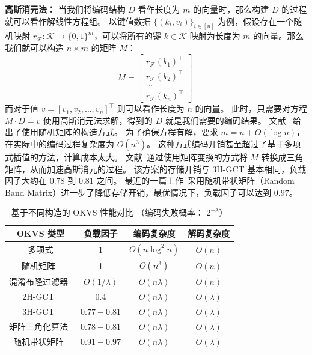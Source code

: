 \textbf{高斯消元法：}
当我们将编码结构 $D$ 看作长度为 $m$ 的向量时，那么构建 $D$ 的过程就可以看作解线性方程组。
以键值数据 $\{(k_i, v_i)\}_{i\in [n]}$ 为例，假设存在一个随机映射 $r_{\mathcal{F}}:\mathcal{K} \to \{0,1\}^m$，可以将所有的键 $k\in \mathcal{K}$ 映射为长度为 $m$ 的向量。那么我们就可以构造 $n\times m$ 的矩阵 $M$：
\begin{equation}
  M = \left[ \begin{array}{c} r_{\mathcal{F}}(k_1)^\intercal \\ r_{\mathcal{F}}(k_2)^\intercal \\ \dots \\ r_{\mathcal{F}}(k_n)^\intercal  \end{array}  \right].
\end{equation}
而对于值 $v=[v_1, v_2, \dots, v_n]^\intercal$ 则可以看作长度为 $n$ 的向量。
此时，只需要对方程 $M\cdot D = v$ 使用高斯消元法求解，得到的 $D$ 就是我们需要的编码结果。
文献~\cite{garimella2021oblivious} 给出了使用随机矩阵的构造方式。
为了确保方程有解，要求 $m = n + O(\log n)$，在实际中的编码过程复杂度为 $O(n^3)$。
这种方式编码开销甚至超过了基于多项式插值的方法，计算成本太大。
文献~\cite{raghuraman2022blazing}通过使用矩阵变换的方式将 $M$ 转换成三角矩阵，从而加速高斯消元的过程。
该方案的存储开销与 3H-GCT 基本相同，负载因子大约在 $0.78$ 到 $0.81$ 之间。
最近的一篇工作~\cite{bienstock2023NearOptimal}采用随机带状矩阵（Random Band Matrix）进一步了降低存储开销，最优情况下，负载因子可以达到 $0.97$。

\begin{table}[ht]
  \centering
  \caption{基于不同构造的 OKVS 性能对比 （编码失败概率： $2^{-\lambda}$）}
  \label{tab:okvs_comparison}
  \begin{tabular}{cccc}
    \toprule
    OKVS 类型  &  负载因子  &  编码复杂度 & 解码复杂度 \\
    \midrule
    多项式 & 1 & $O(n\log^2n)$ & $O(n)$ \\
    随机矩阵~\cite{garimella2021oblivious} & 1 & $O(n^3)$ & $O(n)$ \\
    混淆布隆过滤器~\cite{dong2013when} & $O(1/\lambda)$ & $O(n\lambda)$ & $O(n)$ \\
    2H-GCT~\cite{pinkas2020psi} & $0.4$ & $O(n\lambda)$ & $O(\lambda)$ \\
    3H-GCT~\cite{garimella2021oblivious} & $0.77-0.81$ & $O(n\lambda)$ & $O(\lambda)$ \\
    矩阵三角化算法~\cite{raghuraman2022blazing} & $0.78-0.81$ & $O(n\lambda)$ & $O(\lambda)$ \\
    随机带状矩阵~\cite{bienstock2023NearOptimal} & $0.91-0.97$ & $O(n\lambda)$ & $O(\lambda)$ \\
    \bottomrule
  \end{tabular}
\end{table}

